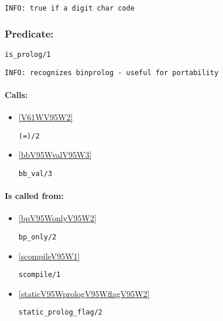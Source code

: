 {\small \begin{verbatim}
INFO: true if a digit char code

\end{verbatim}}

\subsubsection{Predicate:} \label{isV95WprologV95W1}

\begin{verbatim}
is_prolog/1
\end{verbatim}

{\small \begin{verbatim}
INFO: recognizes binprolog - useful for portability

\end{verbatim}}
\paragraph{Calls:} 
\begin{itemize}
\item \ref{V61WV95W2} 
\begin{verbatim}
(=)/2
\end{verbatim}

\item \ref{bbV95WvalV95W3} 
\begin{verbatim}
bb_val/3
\end{verbatim}

\end{itemize}
\paragraph{Is called from:} 
\begin{itemize}
\item \ref{bpV95WonlyV95W2} 
\begin{verbatim}
bp_only/2
\end{verbatim}

\item \ref{scompileV95W1} 
\begin{verbatim}
scompile/1
\end{verbatim}

\item \ref{staticV95WprologV95WflagV95W2} 
\begin{verbatim}
static_prolog_flag/2
\end{verbatim}

\end{itemize}

